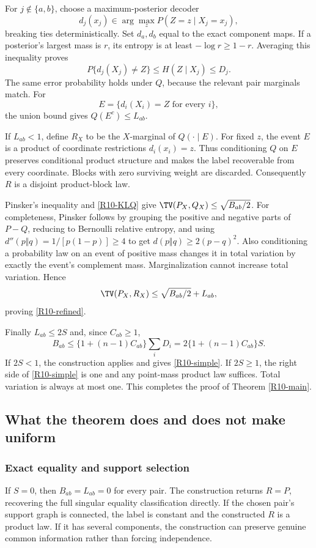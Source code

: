 \documentclass[11pt,a4paper]{article}
\theoremstyle{definition}\newtheorem{definition}[theorem]{Definition}
\theoremstyle{remark}\newtheorem{remark}[theorem]{Remark}
\numberwithin{equation}{section}
\begin{document}
For $j\notin\{a,b\}$, choose a maximum-posterior decoder
\[
 d_j(x_j)\in\arg\max_z P(Z=z\mid X_j=x_j),
\]
breaking ties deterministically. Set $d_a,d_b$ equal to the exact component maps. If a posterior's largest mass is $r$, its entropy is at least $-\log r\ge1-r$. Averaging this inequality proves
\[
 P\{d_j(X_j)\ne Z\}\le H(Z\mid X_j)\le D_j.
\]
The same error probability holds under $Q$, because the relevant pair marginals match. For
\[
 E=\{d_i(X_i)=Z\text{ for every }i\},
\]
the union bound gives $Q(E^c)\le L_{ab}$.

If $L_{ab}<1$, define $R_X$ to be the $X$-marginal of $Q(\cdot\mid E)$. For fixed $z$, the event $E$ is a product of coordinate restrictions $d_i(x_i)=z$. Thus conditioning $Q$ on $E$ preserves conditional product structure and makes the label recoverable from every coordinate. Blocks with zero surviving weight are discarded. Consequently $R$ is a disjoint product-block law.

Pinsker's inequality and \eqref{R10-KLQ} give $\TV(P_X,Q_X)\le\sqrt{B_{ab}/2}$. For completeness, Pinsker follows by grouping the positive and negative parts of $P-Q$, reducing to Bernoulli relative entropy, and using $d''(p\Vert q)=1/[p(1-p)]\ge4$ to get $d(p\Vert q)\ge2(p-q)^2$. Also conditioning a probability law on an event of positive mass changes it in total variation by exactly the event's complement mass. Marginalization cannot increase total variation. Hence
\[
 \TV(P_X,R_X)\le\sqrt{B_{ab}/2}+L_{ab},
\]
proving \eqref{R10-refined}.

Finally $L_{ab}\le2S$ and, since $C_{ab}\ge1$,
\[
 B_{ab}\le\{1+(n-1)C_{ab}\}\sum_iD_i
 =2\{1+(n-1)C_{ab}\}S.
\]
If $2S<1$, the construction applies and gives \eqref{R10-simple}. If $2S\ge1$, the right side of \eqref{R10-simple} is one and any point-mass product law suffices. Total variation is always at most one. This completes the proof of Theorem \ref{R10-main}.

\subsection{What the theorem does and does not make uniform}\label{R10-sec-5}
\subsubsection{Exact equality and support selection}
If $S=0$, then $B_{ab}=L_{ab}=0$ for every pair. The construction returns $R=P$, recovering the full singular equality classification directly. If the chosen pair's support graph is connected, the label is constant and the constructed $R$ is a product law. If it has several components, the construction can preserve genuine common information rather than forcing independence.
\end{document}
